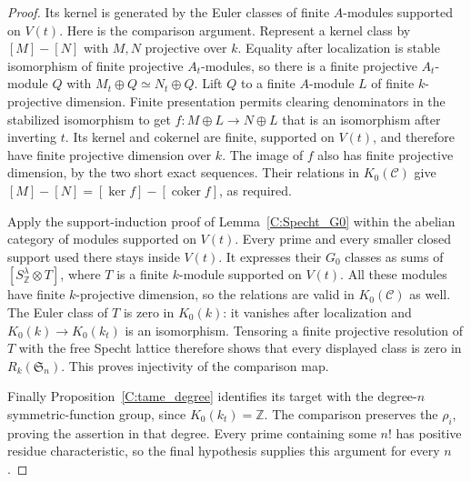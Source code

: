 \begin{proof}
Its kernel is generated by the Euler classes of finite $A$-modules
supported on $V(t)$. Here is the comparison argument. Represent a kernel
class by $[M]-[N]$ with $M,N$ projective over $k$. Equality after
localization is stable isomorphism of finite projective $A_t$-modules,
so there is a finite projective $A_t$-module $Q$ with
$M_t\oplus Q\simeq N_t\oplus Q$. Lift $Q$ to a finite $A$-module
$L$ of finite $k$-projective dimension. Finite presentation permits
clearing denominators in the stabilized isomorphism to get
$f:M\oplus L\to N\oplus L$ that is an isomorphism after inverting
$t$. Its kernel and cokernel are finite, supported on $V(t)$, and
therefore have finite projective dimension over $k$. The image of $f$
also has finite projective dimension, by the two short exact sequences.
Their relations in $K_0(\mathcal C)$ give
$[M]-[N]=[\ker f]-[\operatorname{coker}f]$, as required.

Apply the support-induction proof of Lemma~\ref{C:Specht_G0} within
the abelian category of modules supported on $V(t)$. Every prime and
every smaller closed support used there stays inside $V(t)$. It
expresses their $G_0$ classes as sums of
$[S^\lambda_{\mathbb Z}\otimes T]$, where $T$ is a finite $k$-module
supported on $V(t)$. All these modules have finite $k$-projective
dimension, so the relations are valid in $K_0(\mathcal C)$ as well.
The Euler class of $T$ is zero in $K_0(k)$: it vanishes after
localization and $K_0(k)\to K_0(k_t)$ is an isomorphism.
Tensoring a finite projective resolution of $T$ with the free Specht
lattice therefore shows that every displayed class is zero in
$R_k(\mathfrak S_n)$. This proves injectivity of the comparison map.

Finally Proposition~\ref{C:tame_degree} identifies its target with
the degree-$n$ symmetric-function group, since $K_0(k_t)=\mathbb Z$.
The comparison preserves the $\rho_i$, proving the assertion in that
degree. Every prime containing some $n!$ has positive residue
characteristic, so the final hypothesis supplies this argument for
every $n$.
\end{proof}

